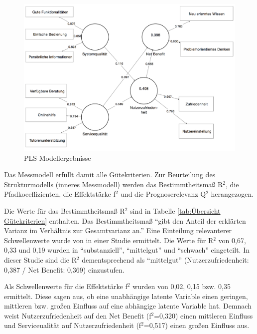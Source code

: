 \begin{figure}[h]
\centering
\includegraphics[width=1\textwidth]{Grafiken/pls_bw_3.png}
\caption{PLS Modellergebnisse}
\label{PLS Modellergebnisse}
\end{figure}


Das Messmodell erfüllt damit alle Gütekriterien. Zur Beurteilung des Strukturmodells (inneres Messmodell) werden das Bestimmtheitsmaß R$^2$, die Pfadkoeeffizienten, die Effektstärke f$^2$ und die Prognoserelevanz Q$^2$ herangezogen.  

Die Werte für das Bestimmtheitsmaß R$^2$ sind in Tabelle \ref{tab:Übersicht Gütekriterien} enthalten. Das Bestimmtheitsmaß "`gibt den Anteil der erklärten Varianz im Verhältnis zur Gesamtvarianz an."' \parencite[S.32]{nitzl2010anwenderorientierte} Eine Einteilung relevanterer Schwellenwerte wurde von \textcite[S.323]{chin1998partial} in einer Studie ermittelt. Die Werte für R$^2$ von 0,67, 0,33 und 0,19 wurden in "`substanziell"', "`mittelgut"' und "`schwach"' eingeteilt. In dieser Studie sind die R$^2$ dementsprechend als "`mittelgut"' (Nutzerzufriedenheit: 0,387 / Net Benefit: 0,369) einzustufen.

Als Schwellenwerte für die Effektstärke f$^2$ wurden von \textcite[S.316f.]{chin1998partial} 0,02, 0,15 bzw. 0,35 ermittelt. Diese sagen aus, ob eine unabhängige latente Variable einen geringen, mittleren bzw. großen Einfluss auf eine abhängige latente Variable hat. Demnach weist Nutzerzufriedenheit auf den Net Benefit (f$^2$=0,320) einen mittleren Einfluss und Serviceualität auf Nutzerzufriedenheit (f$^2$=0,517) einen großen Einfluss aus. 

